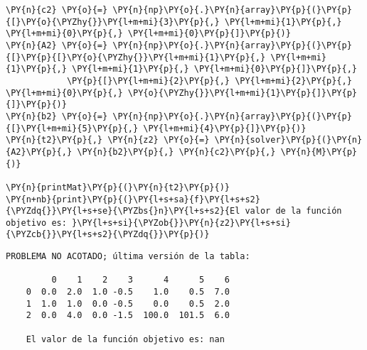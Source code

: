 \documentclass[12pt]{article}
\begin{document}
\begin{tcolorbox}[breakable, size=fbox, boxrule=1pt, pad at break*=1mm,colback=cellbackground, colframe=cellborder]
\begin{Verbatim}[commandchars=\\\{\}]
\PY{n}{c2} \PY{o}{=} \PY{n}{np}\PY{o}{.}\PY{n}{array}\PY{p}{(}\PY{p}{[}\PY{o}{\PYZhy{}}\PY{l+m+mi}{3}\PY{p}{,} \PY{l+m+mi}{1}\PY{p}{,} \PY{l+m+mi}{0}\PY{p}{,} \PY{l+m+mi}{0}\PY{p}{]}\PY{p}{)}
\PY{n}{A2} \PY{o}{=} \PY{n}{np}\PY{o}{.}\PY{n}{array}\PY{p}{(}\PY{p}{[}\PY{p}{[}\PY{o}{\PYZhy{}}\PY{l+m+mi}{1}\PY{p}{,} \PY{l+m+mi}{1}\PY{p}{,} \PY{l+m+mi}{1}\PY{p}{,} \PY{l+m+mi}{0}\PY{p}{]}\PY{p}{,}
            \PY{p}{[}\PY{l+m+mi}{2}\PY{p}{,} \PY{l+m+mi}{2}\PY{p}{,} \PY{l+m+mi}{0}\PY{p}{,} \PY{o}{\PYZhy{}}\PY{l+m+mi}{1}\PY{p}{]}\PY{p}{]}\PY{p}{)}
\PY{n}{b2} \PY{o}{=} \PY{n}{np}\PY{o}{.}\PY{n}{array}\PY{p}{(}\PY{p}{[}\PY{l+m+mi}{5}\PY{p}{,} \PY{l+m+mi}{4}\PY{p}{]}\PY{p}{)}
\PY{n}{t2}\PY{p}{,} \PY{n}{z2} \PY{o}{=} \PY{n}{solver}\PY{p}{(}\PY{n}{A2}\PY{p}{,} \PY{n}{b2}\PY{p}{,} \PY{n}{c2}\PY{p}{,} \PY{n}{M}\PY{p}{)}

\PY{n}{printMat}\PY{p}{(}\PY{n}{t2}\PY{p}{)}
\PY{n+nb}{print}\PY{p}{(}\PY{l+s+sa}{f}\PY{l+s+s2}{\PYZdq{}}\PY{l+s+se}{\PYZbs{}n}\PY{l+s+s2}{El valor de la función objetivo es: }\PY{l+s+si}{\PYZob{}}\PY{n}{z2}\PY{l+s+si}{\PYZcb{}}\PY{l+s+s2}{\PYZdq{}}\PY{p}{)}
\end{Verbatim}
\end{tcolorbox}
    
\begin{Verbatim}[commandchars=\\\{\}]
    PROBLEMA NO ACOTADO; última versión de la tabla:

         0    1    2    3      4      5    6
    0  0.0  2.0  1.0 -0.5    1.0    0.5  7.0
    1  1.0  1.0  0.0 -0.5    0.0    0.5  2.0
    2  0.0  4.0  0.0 -1.5  100.0  101.5  6.0

    El valor de la función objetivo es: nan
\end{Verbatim}
\end{document}
